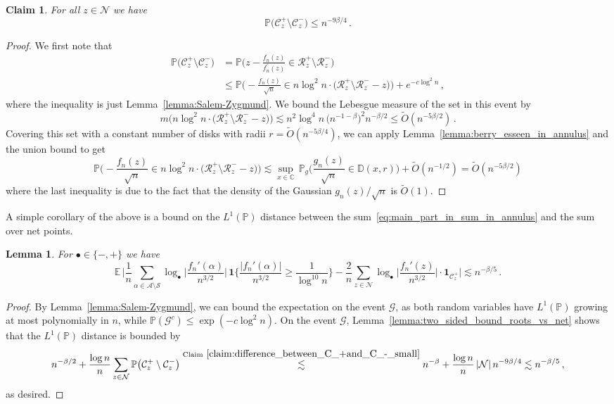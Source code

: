\documentclass[11pt]{amsart}
\newtheorem{lemma}[theorem]{Lemma}
\newtheorem{claim}[theorem]{Claim}
\theoremstyle{remark}
\theoremstyle{definition}
\newcommand{\cR}{\mathcal R}
\newcommand{\bC}{\mathbb C}
\newcommand{\bD}{\mathbb D}
\newcommand{\bP}{\mathbb P}
\newcommand{\bE}{\mathbb E}
\newcommand{\cA}{\mathcal A}
\newcommand{\cC}{\mathcal C}
\newcommand{\cN}{\mathcal N}
\newcommand{\cG}{\mathcal G}
\newcommand{\one}{\boldsymbol{1}}
\begin{document}
    \begin{claim}
        \label{claim:difference_between_C_+and_C_-_small}
        For all $z\in \cN$ we have 
        \[
        \bP\big( \cC_z^+ \setminus \cC_z^- \big) \le n^{-9\beta/4} \, . 
        \]
    \end{claim}
    \begin{proof}
        We first note that 
        \begin{align*}
            \bP\big( \cC_z^+ \setminus \cC_z^- \big) &= \bP\Big(z-\frac{f_n(z)}{f_n^\prime(z)} \in \cR_z^+\setminus \cR_z^-\Big) \\ & \le \bP\Big(-\frac{f_n(z)}{\sqrt{n}} \in n\log^2 n\cdot\big(\cR_z^+\setminus \cR_z^- - z\big)\Big) + e^{-c\log^2 n} \, ,
        \end{align*}
        where the inequality is just Lemma~\ref{lemma:Salem-Zygmund}. We bound the Lebesgue measure of the set in this event by
        \[
        m\Big(n\log^2 n\cdot\big(\cR_z^+\setminus \cR_z^- - z\big)\Big) \lesssim n^2 \log^4 n \, \big(n^{-1-\beta}\big)^2 n^{-\beta/2} \le \widetilde{O}(n^{-5\beta/2}) \, .
        \]
        Covering this set with a constant number of disks with radii $r = \widetilde{O}(n^{-5\beta/4})$, we can apply Lemma~\ref{lemma:berry_esseen_in_annulus} and the union bound to get
        \[
        \bP\Big(-\frac{f_n(z)}{\sqrt{n}} \in n\log^2 n\cdot\big(\cR_z^+\setminus \cR_z^- - z\big)\Big) \lesssim \sup_{x\in \bC} \, \bP_g\Big(\frac{g
        _n(z)}{\sqrt{n}} \in \bD(x, r) \Big)  + \widetilde{O}(n^{-1/2}) = \widetilde{O}(n^{-5\beta/2})
        \]
        where the last inequality is due to the fact that the density of the Gaussian $g_n(z)/\sqrt{n}$ is $\widetilde{O}(1)$. 
    \end{proof}
    A simple corollary of the above is a bound on the $L^1(\bP)$ distance between the sum~\eqref{eq:main_part_in_sum_in_annulus} and the sum over net points. 
    \begin{lemma}
        \label{lemma:sum_over_roots_and_sum_over_net_are_close_in_L_1}
        For $\bullet \in \{-,+\}$ we have
        \begin{equation*}
            \bE \, \bigg| \frac{1}{n} \sum_{\alpha \in \cA\setminus \mathcal{S}} \log_\bullet \Big|\frac{f_n'(\alpha)}{n^{3/2}} \Big| \, \one\Big\{\frac{|f_n'(\alpha)|}{n^{3/2}} \geq \frac{1}{\log^{10}n}  \Big\} - \frac{2}{n} \sum_{z \in \cN} \log_\bullet \Big|\frac{f_n'(z)}{n^{3/2}} \Big| \cdot \one_{\cC_z^+} \bigg| \lesssim n^{-\beta/5} \, .
        \end{equation*}
    \end{lemma}
    \begin{proof}
        By Lemma~\ref{lemma:Salem-Zygmund}, we can bound the expectation on the event $\cG$, as both random variables have $L^1(\bP)$ growing at most polynomially in $n$, while $\bP(\cG^c) \le \exp(-c\log^2 n)$. On the event $\cG$, Lemma~\ref{lemma:two_sided_bound_roots_vs_net} shows that the $L^1(\bP)$ distance is bounded by 
        \[
        n^{-\beta/2} + \frac{\log n}{n} \sum_{z\in \cN} \bP\big( \cC_z^+ \setminus \cC_z^- \big) \stackrel{\text{Claim}~\ref{claim:difference_between_C_+and_C_-_small}}{\lesssim} n^{-\beta} + \frac{\log n}{n} \, |\cN| \, n^{-9\beta/4} \lesssim n^{-\beta/5} \, ,
        \]
        as desired. 
    \end{proof}
\end{document}

